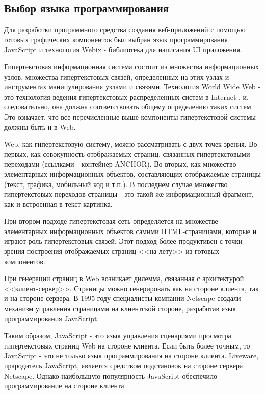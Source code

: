 \subsection{Выбор языка программирования}
\label{sec:modeling:language}

Для разработки программного средства создания веб-приложений с помощью 
готовых графических компонентов был выбран язык программирования JavaScript и технология Webix - библиотека для написания UI приложения.

Гипертекстовая информационная система состоит из множества информационных узлов, множества гипертекстовых связей, определенных на этих узлах и инструментах манипулирования узлами и связями. Технология World Wide Web - это технология ведения гипертекстовых распределенных систем в Internet , и, следовательно, она должна соответствовать общему определению таких систем. Это означает, что все перечисленные выше компоненты гипертекстовой системы должны быть и в Web.

Web, как гипертекстовую систему, можно рассматривать с двух точек зрения. Во-первых, как совокупность отображаемых страниц, связанных гипертекстовыми переходами (ссылками - контейнер ANCHOR). Во-вторых, как множество элементарных информационных объектов, составляющих отображаемые страницы (текст, графика, мобильный код и т.п.). В последнем случае множество гипертекстовых переходов страницы - это такой же информационный фрагмент, как и встроенная в текст картинка.

При втором подходе гипертекстовая сеть определяется на множестве элементарных информационных объектов самими HTML-страницами, которые и играют роль гипертекстовых связей. Этот подход более продуктивен с точки зрения построения отображаемых страниц <<на лету>> из готовых компонентов.

При генерации страниц в Web возникает дилемма, связанная с архитектурой <<клиент-сервер>>. Страницы можно генерировать как на стороне клиента, так и на стороне сервера. В 1995 году специалисты компании Netscape создали механизм управления страницами на клиентской стороне, разработав язык программирования JavaScript.

Таким образом, JavaScript - это язык управления сценариями просмотра гипертекстовых страниц Web на стороне клиента. Если быть более точным, то JavaScript - это не только язык программирования на стороне клиента. Liveware, прародитель JavaScript, является средством подстановок на стороне сервера Netscape. Однако наибольшую популярность JavaScript обеспечило программирование на стороне клиента.

